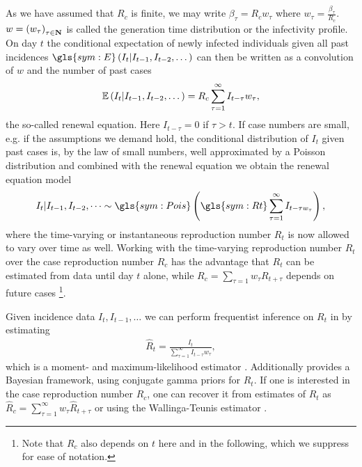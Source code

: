 As we have assumed that $R_{c}$ is finite, we may write $\beta_{\tau} = R_{c}w_{\tau}$ where $w_{\tau} = \frac{\beta_{\tau}}{R_{c}}$. $w = \left( w_{\tau} \right)_{\tau \in \mathbf N}$ is called the generation time distribution or the infectivity profile. On day $t$ the conditional expectation of newly infected individuals given all past incidences $\gls{sym:E} \left(I_{t}| I_{t - 1}, I_{t - 2}, \dots \right)$  can then be written as a convolution of $w$ and the number of past cases 
\begin{align}
    \label{eq:renewal-eq}
\mathbb E \left(I_{t}| I_{t - 1}, I_{t - 2}, \dots \right) = R_{c} \sum_{\tau = 1}^\infty I_{t - \tau} w_{\tau},
\end{align}
the so-called renewal equation. Here $I_{t - \tau} = 0$ if $\tau > t$. If case numbers are small, e.g. if the assumptions we demand hold, the conditional distribution of $I_{t}$ given past cases is, by the law of small numbers, well approximated by a Poisson distribution and combined with the renewal equation we obtain the renewal equation model \citep{Fraser2007Estimating}
\begin{align}
    \label{eq:renewal-model}
    I_{t} | I_{t - 1}, I_{t - 2}, \dots \sim \gls{sym:Pois} \left( \gls{sym:Rt} \sum _{\tau = 1}^\infty I_{t - \tau w_{\tau}} \right),
\end{align}
where the time-varying or instantaneous reproduction number $R_{t}$ is now allowed to vary over time as well. Working with the time-varying reproduction number $R_{t}$ over the case reproduction number $R_{c}$ has the advantage that $R_{t}$ can be estimated from data until day $t$ alone, while $R_{c} = \sum_{\tau = 1} w_{\tau} R_{ t + \tau }$ depends on future cases \citep{Fraser2007Estimating}\footnote{Note that $R_{c}$ also depends on $t$ here and in the following, which we suppress for ease of notation.}. 

Given incidence data $I_{t}, I_{t - 1}, \dots $ we can perform frequentist inference on $R_{t}$ in  by estimating
\begin{align}
    \label{eq:hatR}
    \hat R_{t} = \frac{I_{t}}{\sum_{\tau = 1}^{\infty} I_{t - \tau} w_{\tau}},
\end{align}
which is a moment- and maximum-likelihood estimator \citep{Hotz2020Monitoring}. Additionally \citep{Cori2021EpiEstim} provides a Bayesian framework, using conjugate gamma priors for $R_{t}$. If one is interested in the case reproduction number $R_{c}$, one can recover it from estimates of $R_{t}$ as $\hat R_{c} = \sum_{\tau = 1}^\infty w_{\tau} \hat R_{t + \tau}$ or using the Wallinga-Teunis estimator \citep{Wallinga2004Different}.

